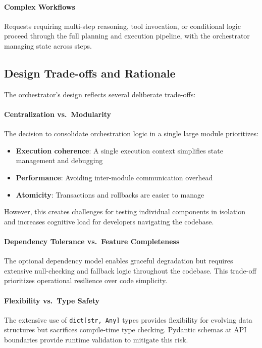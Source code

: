 \paragraph{Complex Workflows} Requests requiring multi-step reasoning, tool invocation, or conditional logic proceed through the full planning and execution pipeline, with the orchestrator managing state across steps.

\subsection{Design Trade-offs and Rationale}

The orchestrator's design reflects several deliberate trade-offs:

\paragraph{Centralization vs.\ Modularity} The decision to consolidate orchestration logic in a single large module prioritizes:
\begin{itemize}
    \item \textbf{Execution coherence}: A single execution context simplifies state management and debugging
    \item \textbf{Performance}: Avoiding inter-module communication overhead
    \item \textbf{Atomicity}: Transactions and rollbacks are easier to manage
\end{itemize}
However, this creates challenges for testing individual components in isolation and increases cognitive load for developers navigating the codebase.

\paragraph{Dependency Tolerance vs.\ Feature Completeness} The optional dependency model enables graceful degradation but requires extensive null-checking and fallback logic throughout the codebase. This trade-off prioritizes operational resilience over code simplicity.

\paragraph{Flexibility vs.\ Type Safety} The extensive use of \texttt{dict[str, Any]} types provides flexibility for evolving data structures but sacrifices compile-time type checking. Pydantic schemas at API boundaries provide runtime validation to mitigate this risk.

